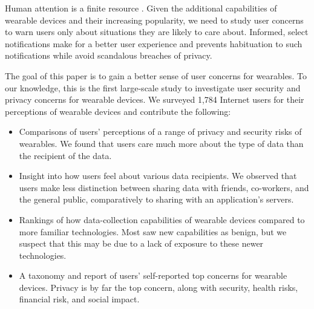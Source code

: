 Human attention is a finite resource \cite{bohme2011security}. Given the additional capabilities of wearable devices and their increasing popularity, we need to study user concerns to warn users only about situations they are likely to care about. Informed, select notifications make for a better user experience and prevents habituation to such notifications while avoid scandalous breaches of privacy. 

The goal of this paper is to gain a better sense of user concerns for wearables. To our knowledge, this is the first large-scale study to investigate user security and privacy concerns for wearable devices. We surveyed 1,784 Internet users for their perceptions of wearable devices and contribute the following: \\[-0.8cm]

\begin{itemize} \itemsep1pt \parskip0pt 
\item Comparisons of users' perceptions of a range of privacy and security risks of wearables. We found that users care much more about the type of data than the recipient of the data.
\item Insight into how users feel about various data recipients. We observed that users make less distinction between sharing data with friends, co-workers, and the general public, comparatively to sharing with an application's servers.
\item Rankings of how data-collection capabilities of wearable devices compared to more familiar technologies.  Most saw new capabilities as benign, but we suspect that this may be due to a lack of exposure to these newer technologies.
\item A taxonomy and report of users' self-reported top concerns for wearable devices. Privacy is by far the top concern, along with security, health risks, financial risk, and social impact. 
\end{itemize}